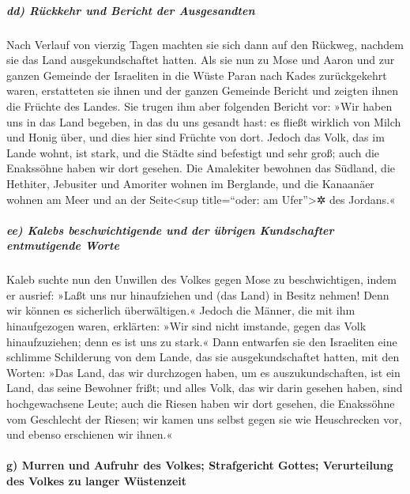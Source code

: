 \hypertarget{dd-ruxfcckkehr-und-bericht-der-ausgesandten}{%
\subparagraph{dd) Rückkehr und Bericht der
Ausgesandten}\label{dd-ruxfcckkehr-und-bericht-der-ausgesandten}}

Nach Verlauf von vierzig Tagen machten sie sich dann auf
den Rückweg, nachdem sie das Land ausgekundschaftet hatten.
Als sie nun zu Mose und Aaron und zur ganzen Gemeinde der
Israeliten in die Wüste Paran nach Kades zurückgekehrt waren,
erstatteten sie ihnen und der ganzen Gemeinde Bericht und zeigten ihnen
die Früchte des Landes. Sie trugen ihm aber folgenden
Bericht vor: »Wir haben uns in das Land begeben, in das du uns gesandt
hast: es fließt wirklich von Milch und Honig über, und dies hier sind
Früchte von dort. Jedoch das Volk, das im Lande wohnt,
ist stark, und die Städte sind befestigt und sehr groß; auch die
Enakssöhne haben wir dort gesehen. Die Amalekiter
bewohnen das Südland, die Hethiter, Jebusiter und Amoriter wohnen im
Berglande, und die Kanaanäer wohnen am Meer und an der
Seite\textless sup title=``oder: am Ufer''\textgreater✲ des Jordans.«

\hypertarget{ee-kalebs-beschwichtigende-und-der-uxfcbrigen-kundschafter-entmutigende-worte}{%
\subparagraph{ee) Kalebs beschwichtigende und der übrigen Kundschafter
entmutigende
Worte}\label{ee-kalebs-beschwichtigende-und-der-uxfcbrigen-kundschafter-entmutigende-worte}}

Kaleb suchte nun den Unwillen des Volkes gegen Mose zu
beschwichtigen, indem er ausrief: »Laßt uns nur hinaufziehen und (das
Land) in Besitz nehmen! Denn wir können es sicherlich überwältigen.«
Jedoch die Männer, die mit ihm hinaufgezogen waren,
erklärten: »Wir sind nicht imstande, gegen das Volk hinaufzuziehen; denn
es ist uns zu stark.« Dann entwarfen sie den Israeliten
eine schlimme Schilderung von dem Lande, das sie ausgekundschaftet
hatten, mit den Worten: »Das Land, das wir durchzogen haben, um es
auszukundschaften, ist ein Land, das seine Bewohner frißt; und alles
Volk, das wir darin gesehen haben, sind hochgewachsene Leute;
auch die Riesen haben wir dort gesehen, die Enakssöhne
vom Geschlecht der Riesen; wir kamen uns selbst gegen sie wie
Heuschrecken vor, und ebenso erschienen wir ihnen.«

\hypertarget{g-murren-und-aufruhr-des-volkes-strafgericht-gottes-verurteilung-des-volkes-zu-langer-wuxfcstenzeit}{%
\paragraph{g) Murren und Aufruhr des Volkes; Strafgericht Gottes;
Verurteilung des Volkes zu langer
Wüstenzeit}\label{g-murren-und-aufruhr-des-volkes-strafgericht-gottes-verurteilung-des-volkes-zu-langer-wuxfcstenzeit}}

